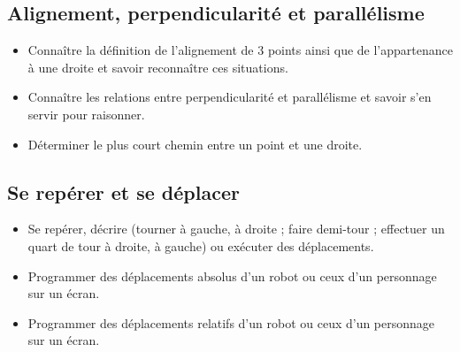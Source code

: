 \documentclass[a4paper,12pt,fleqn]{article}		
\begin{document}
\subsection*{Alignement, perpendicularité et parallélisme}

\begin{itemize}
	\item {}Connaître la définition de l’alignement de 3 points ainsi que de l’appartenance à une droite et savoir reconnaître ces situations.
	\item {}Connaître les relations entre perpendicularité et parallélisme et savoir s’en servir pour raisonner.
	\item {}Déterminer le plus court chemin entre un point et une droite. %
\end{itemize}

\subsection*{Se repérer et se déplacer}

\begin{itemize}
	\item {}Se repérer, décrire (tourner à gauche, à droite ; faire demi-tour ; effectuer un quart de tour à droite, à gauche) ou exécuter des déplacements.
	\item {}Programmer des déplacements absolus d’un robot ou ceux d’un personnage sur un écran. %
	\item {}Programmer des déplacements relatifs d’un robot ou ceux d’un personnage sur un écran. %
\end{itemize}
\end{document}
